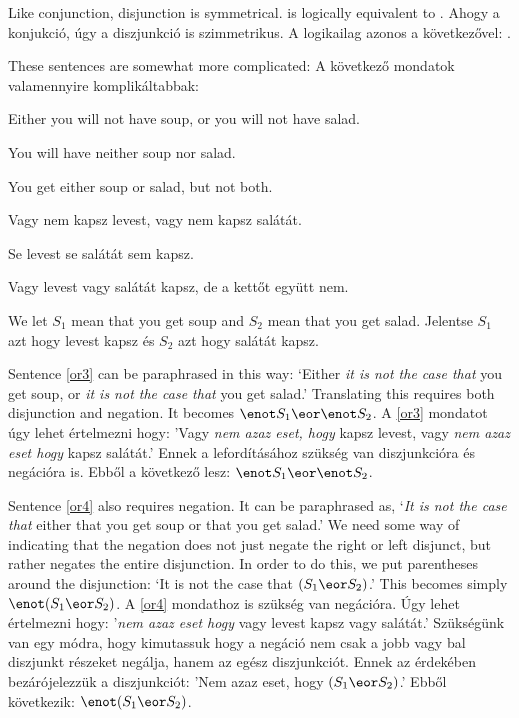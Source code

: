 Like conjunction, disjunction is symmetrical. \eor{} is logically equivalent to \eor{}.
Ahogy a konjukció, úgy a diszjunkció is szimmetrikus. A \eor{} logikailag azonos a következővel: \eor{}.


These sentences are somewhat more complicated:
A következő mondatok valamennyire komplikáltabbak:

\begin{earg}
\item[\ex{or3}] Either you will not have soup, or you will not have salad.
\item[\ex{or4}] You will have neither soup nor salad.
\item[\ex{or.xor}] You get either soup or salad, but not both.
\end{earg}


\begin{earg}
\item[\ex{or3}] Vagy nem kapsz levest, vagy nem kapsz salátát.
\item[\ex{or4}] Se levest se salátát sem kapsz.
\item[\ex{or.xor}] Vagy levest vagy salátát kapsz, de a kettőt együtt nem.
\end{earg}

We let $S_1$ mean that you get soup and $S_2$ mean that you get salad.
Jelentse $S_1$ azt hogy levest kapsz és $S_2$ azt hogy salátát kapsz.

Sentence \ref{or3} can be paraphrased in this way: `Either \emph{it is not the case that} you get soup, or \emph{it is not the case that} you get salad.' Translating this requires both disjunction and negation. It becomes $\enot S_1 \eor \enot S_2$.
A \ref{or3} mondatot úgy lehet értelmezni hogy: 'Vagy \emph{nem azaz eset, hogy} kapsz levest, vagy \emph{nem azaz eset hogy} kapsz salátát.' Ennek a lefordításához szükség van diszjunkcióra és negációra is. Ebből a következő lesz: $\enot S_1 \eor \enot S_2$.

Sentence \ref{or4} also requires negation. It can be paraphrased as, `\emph{It is not the case that} either that you get soup or that you get salad.' We need some way of indicating that the negation does not just negate the right or left disjunct, but rather negates the entire disjunction. In order to do this, we put parentheses around the disjunction: `It is not the case that $(S_1 \eor S_2)$.' This becomes simply $\enot (S_1 \eor S_2)$.
A \ref{or4} mondathoz is szükség van negációra. Úgy lehet értelmezni hogy: '\emph{nem azaz eset hogy} vagy levest kapsz vagy salátát.' Szükségünk van egy módra, hogy kimutassuk hogy a negáció nem csak a jobb vagy bal diszjunkt részeket negálja, hanem az egész diszjunkciót. Ennek az érdekében bezárójelezzük a diszjunkciót: 'Nem azaz eset, hogy $(S_1 \eor S_2)$.' Ebből következik: $\enot (S_1 \eor S_2)$.

